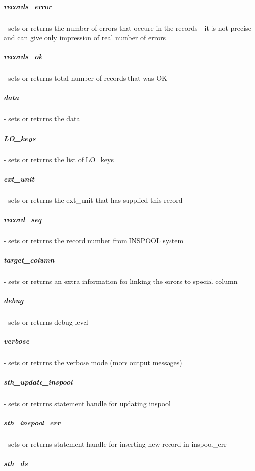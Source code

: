 \subparagraph*{records\_error\label{DataStream_records_error}}


- sets or returns the number of errors that occure in the records - it is not precise and can give only impression of real number of errors

\subparagraph*{records\_ok\label{DataStream_records_ok}}


- sets or returns total number of records that was OK

\subparagraph*{data\label{DataStream_data}}


- sets or returns the data

\subparagraph*{LO\_keys\label{DataStream_LO_keys}}


- sets or returns the list of LO\_keys

\subparagraph*{ext\_unit\label{DataStream_ext_unit}}


- sets or returns the ext\_unit that has supplied this record

\subparagraph*{record\_seq\label{DataStream_record_seq}}


- sets or returns the record number from INSPOOL system

\subparagraph*{target\_column\label{DataStream_target_column}}


- sets or returns an extra information for linking the errors to special column

\subparagraph*{debug\label{DataStream_debug}}


- sets or returns debug level

\subparagraph*{verbose\label{DataStream_verbose}}


- sets or returns the verbose mode (more output messages)

\subparagraph*{sth\_update\_inspool\label{DataStream_sth_update_inspool}}


- sets or returns statement handle for updating inspool

\subparagraph*{sth\_inspool\_err\label{DataStream_sth_inspool_err}}


- sets or returns statement handle for inserting new record in inspool\_err

\subparagraph*{sth\_ds\label{DataStream_sth_ds}}


